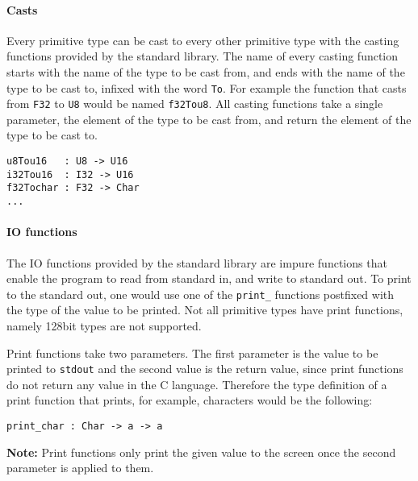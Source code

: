 \documentclass[12pt]{article}
\begin{document}
\paragraph{Casts} Every primitive type can be cast to every other primitive type
with the casting functions provided by the standard library. The name of every
casting function starts with the name of the type to be cast from, and ends with
the name of the type to be cast to, infixed with the word \verb$To$. For example
the function that casts from \verb$F32$ to \verb$U8$ would be named
\verb$f32Tou8$. All casting functions take a single parameter, the element of
the type to be cast from, and return the element of the type to be cast to.
\begin{lstlisting}
u8Tou16   : U8 -> U16
i32Tou16  : I32 -> U16
f32Tochar : F32 -> Char
...
\end{lstlisting}

\paragraph{IO functions} The IO functions provided by the standard library are
impure functions that enable the program to read from standard in, and write to
standard out. To print to the standard out, one would use one of the
\verb$print_$ functions postfixed with the type of the value to be printed. Not
all primitive types have print functions, namely 128bit types are not supported.

Print functions take two parameters. The first parameter is the value to be
printed to \verb$stdout$ and the second value is the return value, since print
functions do not return any value in the C language. Therefore the type
definition of a print function that prints, for example, characters would be the
following:
\begin{lstlisting}
print_char : Char -> a -> a 
\end{lstlisting}
\textbf{Note:} Print functions only print the given value to the screen once the
second parameter is applied to them.
\end{document}
